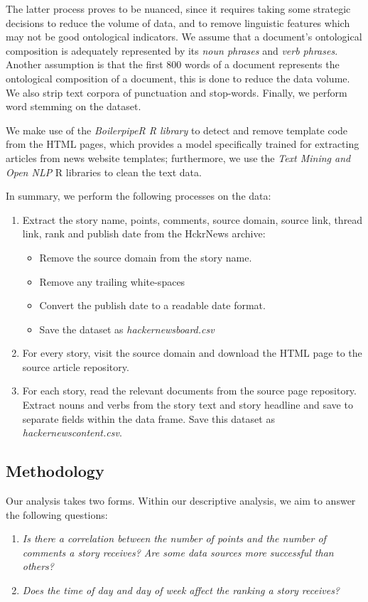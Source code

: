 \documentclass[11pt,journal,final,a4paper]{IEEEtran}
\begin{document}
The latter process proves to be nuanced, since it requires taking some strategic decisions to reduce the volume of data, and to remove linguistic features which may not be good ontological indicators. We assume that a document's ontological composition is adequately represented by its \textit{noun phrases} and \textit{verb phrases}. Another assumption is that the first 800 words of a document represents the ontological composition of a document, this is done to reduce the data volume. We also strip text corpora of punctuation and stop-words. Finally, we perform word stemming on the dataset. 

We make use of the \textit{BoilerpipeR R library}\cite{cran:boilerpiper} to detect and remove template code from the HTML pages, which provides a model specifically trained for extracting articles from news website templates; furthermore, we use the \textit{Text Mining and Open NLP} R libraries to clean the text data\cite{cran:textmining}\cite{cran:opennlp}. 

In summary, we perform the following processes on the data:

\begin{enumerate}
\item Extract the story name, points, comments, source domain, source link, thread link, rank and publish date from the HckrNews\cite{hn:datasource} archive:
\begin{itemize}
\item Remove the source domain from the story name.
\item Remove any trailing white-spaces
\item Convert the publish date to a readable date format.
\item Save the dataset as \textit{hackernewsboard.csv}
\end{itemize}
\item For every story, visit the source domain and download the HTML page to the source article repository.
\item For each story, read the relevant documents from the source page repository. Extract nouns and verbs from the story text and story headline and save to separate fields within the data frame. Save this dataset as \textit{hackernewscontent.csv}.
\end{enumerate}

\subsection{Methodology}
Our analysis takes two forms. Within our descriptive analysis, we aim to answer the following questions:
\begin{enumerate}
\item \textit{Is there a correlation between the number of points and the number of comments a story receives? Are some data sources more successful than others?} 
\item \textit{Does the time of day and day of week affect the ranking a story receives?}
\end{enumerate}
\end{document}
